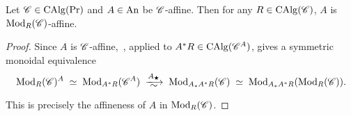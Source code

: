 \documentclass[english,svgnames,table]{article}
\begin{document}
    \begin{lemma}
    \label{lem:affiness-of-ModR}
        Let $\mathscr{C} \in \operatorname{CAlg}(\operatorname{Pr})$ and $A \in \mathrm{An}$ be $\mathscr{C}$-affine. Then for any $R \in \operatorname{CAlg}(\mathscr{C})$, $A$ is $\operatorname{Mod}_R(\mathscr{C})$-affine.
    \end{lemma}
    \begin{proof}
        Since $A$ is $\mathscr{C}$-affine,~\cite[Proposition~2.12]{BCSY-Fourier}, applied to $A^*R \in \operatorname{CAlg}(\mathscr{C}^A)$, gives a symmetric monoidal equivalence
        \begin{equation*}
            \Mod_R(\cC)^A
            \;\simeq\;
            \Mod_{A^*R}(\cC^A)
            \;\xisotoo{A_{\scriptscriptstyle\bigstar}}\;
            \Mod_{A_*A^*R}(\cC)
            \;\simeq\;
            \Mod_{A_*A^*R}(\Mod_R(\cC)).
        \end{equation*}
        This is precisely the affineness of $A$ in $\operatorname{Mod}_R(\mathscr{C})$.
    \end{proof}
\end{document}
